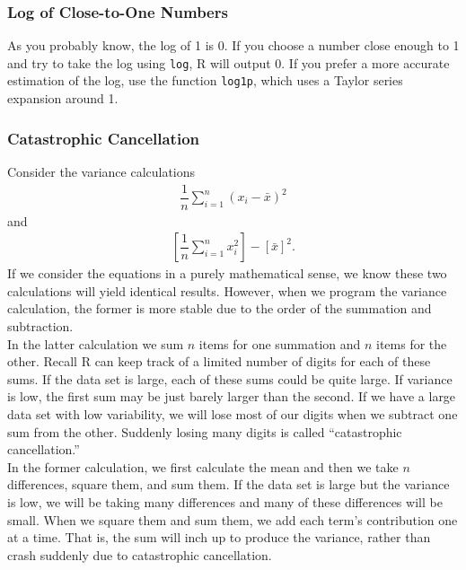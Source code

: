 \documentclass{article}
\begin{document}
\subsubsection{Log of Close-to-One Numbers}
As you probably know, the log of 1 is 0. If you choose a number close enough to 1 and try to take the log   using \texttt{log}, R will output 0. If you prefer a more accurate estimation of the log, use the function \texttt{log1p}, which uses a Taylor series expansion around 1.


\subsubsection{Catastrophic Cancellation}

Consider the variance calculations
\begin{align*}
\dfrac{1}{n} \sum_{i=1}^n (x_i - \bar{x})^2 
\end{align*}
and
\begin{align*}
\left[ \dfrac{1}{n}  \sum_{i=1}^n x_i^2 \right] - \left[\bar{x} \right]^2 .
\end{align*}
If we consider the equations in a purely  mathematical sense, we know these two calculations will yield identical results. However, when we program the variance calculation, the former is more stable due to the order of the summation and subtraction.  \\

 In the latter calculation we sum $n$ items for one summation and $n$ items for the other.  Recall  R can keep track of a limited number of digits for each of these sums. If the data set is large, each of these sums could be quite large. If  variance is low, the first sum may be just barely larger than the second. If we have a large data set with low variability, we will lose most of our digits when we subtract one sum from the other. Suddenly losing many digits is called ``catastrophic cancellation.''\\

In the former calculation, we first calculate the mean and then we take $n$ differences, square them, and sum them. If the data set is large but the variance is low, we will be taking many differences and many of these differences will be small. When we square them and sum them, we add each term's contribution one at a time. That is, the sum will inch up to produce the variance, rather than crash suddenly due to catastrophic cancellation.
\end{document}
